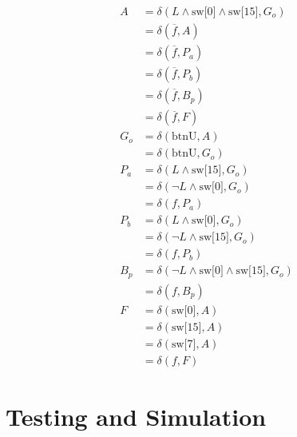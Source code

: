 \documentclass[stu,12pt,floatsintext]{apa7}
\begin{document}
\begin{align}
  A     &= \delta\left(L\wedge\text{sw[0]}\wedge\text{sw[15]},      G_{o}\right) \\
        &= \delta\left(\overline{f},                                A\right) \\
        &= \delta\left(\overline{f},                                P_{a}\right) \\
        &= \delta\left(\overline{f},                                P_{b}\right) \\
        &= \delta\left(\overline{f},                                B_{p}\right) \\
        &= \delta\left(\overline{f},                                F\right) \\
  G_{o} &= \delta\left(\text{btnU},                                 A\right) \\
        &= \delta\left(\text{btnU},                                 G_{o}\right) \\
  P_{a} &= \delta\left(L\wedge\text{sw[15]},                        G_{o}\right) \\
        &= \delta\left(\neg L\wedge\text{sw[0]},                    G_{o}\right) \\
        &= \delta\left(f,                                           P_{a}\right) \\ 
  P_{b} &= \delta\left(L\wedge\text{sw[0]},                         G_{o}\right) \\
        &= \delta\left(\neg L\wedge\text{sw[15]},                   G_{o}\right) \\
        &= \delta\left(f,                                           P_{b}\right) \\
  B_{p} &= \delta\left(\neg L\wedge\text{sw[0]}\wedge\text{sw[15]}, G_{o}\right) \\
        &= \delta\left(f,                                           B_{p}\right) \\
  F     &= \delta\left(\text{sw[0]},                                A\right) \\
        &= \delta\left(\text{sw[15]},                               A\right) \\
        &= \delta\left(\text{sw[7]},                                A\right) \\
        &= \delta\left(f,                                           F\right)
\end{align}

\section{Testing and Simulation}
\end{document}
